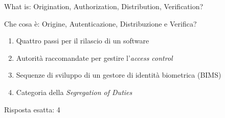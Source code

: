 \begin{Exercise} [
  title={Definizioni},
  label={fr6}
 ]

 \Question What is: Origination, Authorization, Distribution, Verification?

 Che cosa è: Origine, Autenticazione, Distribuzione e Verifica?

 \begin{enumerate}
  \item Quattro passi per il rilascio di un software
  \item Autorità raccomandate per gestire l'\textit{access control}
  \item Sequenze di sviluppo di un gestore di identità biometrica (BIMS)
  \item Categoria della \textit{Segregation of Duties}
 \end{enumerate}

\end{Exercise}

\begin{Answer} [
  ref={fr6},
  number={6}
 ]

 \Question Risposta esatta: 4
\end{Answer}
